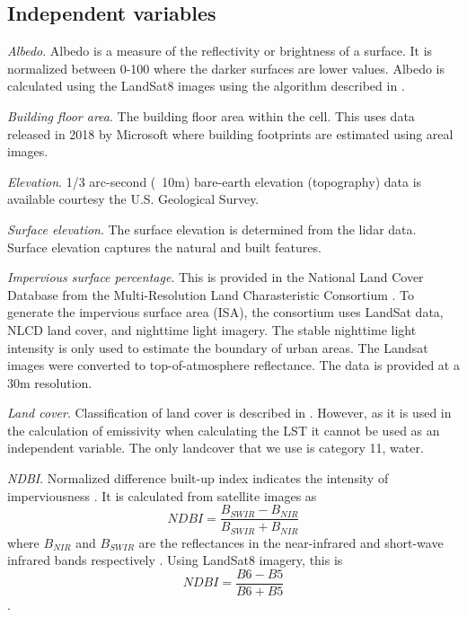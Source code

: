 \documentclass[final,3p,times,twocolumn,sort&compress]{elsarticle}
\begin{document}
\subsection{Independent variables}

\textit{Albedo}. Albedo is a measure of the reflectivity or brightness of a surface. It is normalized between 0-100 where the darker surfaces are lower values. Albedo is calculated using the LandSat8 images using the algorithm described in \cite{Smith2010-nw, Liang2001-jd}. 

\textit{Building floor area}. The building floor area within the cell. This uses data released in 2018 by Microsoft where building footprints are estimated using areal images. 


\textit{Elevation}. 1/3 arc-second (~10m) bare-earth elevation (topography) data is available courtesy the U.S. Geological Survey. 

\textit{Surface elevation}. The surface elevation is determined from the lidar data. Surface elevation captures the natural and built features. 

\textit{Impervious surface percentage}. This is provided in the National Land Cover Database from the Multi-Resolution Land Charasteristic Consortium \cite{Xian2011-aa}. 
To generate the impervious surface area (ISA), the consortium uses LandSat data, NLCD land cover, and nighttime light imagery. 
The stable nighttime light intensity is only used to estimate the boundary of urban areas. 
The Landsat images were converted to top-of-atmosphere reflectance. 
The data is provided at a 30m resolution.

\textit{Land cover}. 
Classification of land cover is described in \cite{Homer2015-ce}. 
However, as it is used in the calculation of emissivity when calculating the LST it cannot be used as an independent variable. 
The only landcover that we use is category 11, water. 

\textit{NDBI}. 
Normalized difference built-up index indicates the intensity of imperviousness \cite{Bhatti2014-ae}. 
It is calculated from satellite images as $$NDBI=\frac{B_{SWIR}-B_{NIR}}{B_{SWIR}+B_{NIR}}$$ where $B_{NIR}$ and $B_{SWIR}$ are the reflectances in the near-infrared and short-wave infrared bands respectively \cite{Alhawiti2016-wv}. 
Using LandSat8 imagery, this is $$NDBI=\frac{B6-B5}{B6+B5}$$ \cite{barsi2014}.
\end{document}
